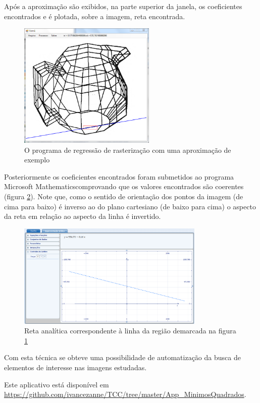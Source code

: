 	Após a aproximação são exibidos, na parte superior da janela, os coeficientes encontrados e é plotada, sobre a imagem, reta encontrada.
	
	\begin{figure}[!htb]
		\centering
		\includegraphics[height=6cm]{imagens/printAppMinimosQuadrados.png}
		\caption{O programa de regressão de rasterização com uma aproximação de exemplo}
		\label{figMinQuadInterface}
	\end{figure}

	Posteriormente os coeficientes encontrados foram submetidos ao programa Microsoft Mathematics\textregistered  comprovando que os valores encontrados são coerentes (figura \ref{mathematics}). Note que, como o sentido de orientação dos pontos da imagem (de cima para baixo) é inverso ao do plano cartesiano (de baixo para cima) o aspecto da reta em relação ao aspecto da linha é invertido.
	
	\begin{figure}[!htb]
		\centering
		\includegraphics[height=5cm]{imagens/mathematics1.png}
		\caption{Reta analítica correspondente à linha da região demarcada na figura \ref{figMinQuadInterface}}
		\label{mathematics}
	\end{figure}
	
	Com esta técnica se obteve uma possibilidade de automatização da busca de elementos de interesse nas imagens estudadas.
	
	Este aplicativo está disponível em \url{https://github.com/ivancezanne/TCC/tree/master/App_MinimosQuadrados}.
	
